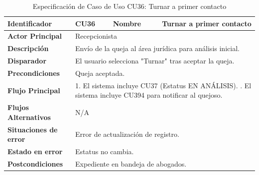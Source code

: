 \begingroup
\setlength{\parskip}{0pt}
\begin{longtable}{|p{3.5cm}|p{2cm}|p{2.5cm}|p{7cm}|}
\caption{Especificación de Caso de Uso CU36: Turnar a primer contacto}
\label{tab:cu36} \\
\hline
\textbf{Identificador} & CU36 & \textbf{Nombre} & Turnar a primer contacto \\ \hline
\textbf{Actor Principal} & \multicolumn{3}{p{11.5cm}|}{Recepcionista} \\ \hline
\textbf{Descripción} & \multicolumn{3}{p{11.5cm}|}{Envío de la queja al área jurídica para análisis inicial.} \\ \hline
\textbf{Disparador} & \multicolumn{3}{p{11.5cm}|}{El usuario selecciona "Turnar" tras aceptar la queja.} \\ \hline
\textbf{Precondiciones} & \multicolumn{3}{p{11.5cm}|}{Queja aceptada.} \\ \hline
\textbf{Flujo Principal} & \multicolumn{3}{p{11.5cm}|}{1. El sistema incluye CU37 (Estatus EN ANÁLISIS). \newline 2. El sistema incluye CU394 para notificar al quejoso.} \\ \hline
\textbf{Flujos Alternativos} & \multicolumn{3}{p{11.5cm}|}{N/A} \\ \hline
\textbf{Situaciones de error} & \multicolumn{3}{p{11.5cm}|}{Error de actualización de registro.} \\ \hline
\textbf{Estado en error} & \multicolumn{3}{p{11.5cm}|}{Estatus no cambia.} \\ \hline
\textbf{Postcondiciones} & \multicolumn{3}{p{11.5cm}|}{Expediente en bandeja de abogados.} \\ \hline
\end{longtable}
\endgroup

\vspace{0.8cm}

